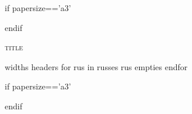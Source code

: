 \documentclass[11pt]{article}
\begin{document}
{{if papersize=='a3'}} \begin{landscape} {{endif}}

\begin{center}
\textsc{ {{title}} }
\begin{longtable}{ {{widths}} }\hline
{{headers}}\endhead
\hline
{{for rus in russes}}
  {{rus}} \vspace{0.2cm} {{empties}}
{{endfor}}
\end{longtable}
\end{center}

{{if papersize=='a3'}} \end{landscape} {{endif}}
\end{document}
